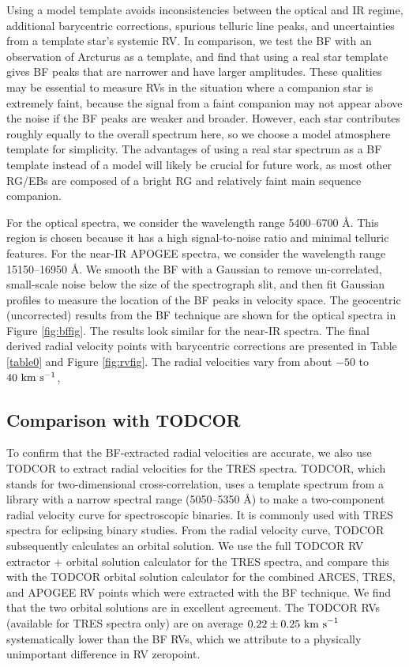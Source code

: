 Using a model template avoids inconsistencies between the optical and IR regime, additional barycentric corrections, spurious telluric line peaks, and uncertainties from a template star's systemic RV. In comparison, we test the BF with an observation of Arcturus as a template, and find that using a real star template gives BF peaks that are narrower and have larger amplitudes. These qualities may be essential to measure RVs in the situation where a companion star is extremely faint, because the signal from a faint companion may not appear above the noise if the BF peaks are weaker and broader. However, each star contributes roughly equally to the overall spectrum here, so we choose a model atmosphere template for simplicity. The advantages of using a real star spectrum as a BF template instead of a model will likely be crucial for future work, as most other RG/EBs are composed of a bright RG and relatively faint main sequence companion.

For the optical spectra, we consider the wavelength range 5400--6700 \AA. This region is chosen because it has a high signal-to-noise ratio and minimal telluric features. For the near-IR APOGEE spectra, we consider the wavelength range 15150--16950 \AA. We smooth the BF with a Gaussian to remove un-correlated, small-scale noise below the size of the spectrograph slit, and then fit Gaussian profiles  to measure the location of the BF peaks in velocity space. The geocentric (uncorrected) results from the BF technique are shown for the optical spectra in Figure \ref{fig:bffig}. The results look similar for the near-IR spectra. The final derived radial velocity points with barycentric corrections are presented in Table \ref{table0} and Figure \ref{fig:rvfig}. The radial velocities vary from about $-50$ to $40 \ \rm{km} \ \rm{s}^{-1}$, 

\subsection{Comparison with TODCOR}\label{todcor}
To confirm that the BF-extracted radial velocities are accurate, we also use TODCOR \citep{zuc94} to extract radial velocities for the TRES spectra. TODCOR, which stands for two-dimensional cross-correlation, uses a template spectrum from a library with a narrow spectral range (5050--5350 \AA) to make a two-component radial velocity curve for spectroscopic binaries. It is commonly used with TRES spectra for eclipsing binary studies. From the radial velocity curve, TODCOR subsequently calculates an orbital solution. We use the full TODCOR RV extractor + orbital solution calculator for the TRES spectra, and compare this with the TODCOR orbital solution calculator for the combined ARCES, TRES, and APOGEE RV points which were extracted with the BF technique. We find that the two orbital solutions are in excellent agreement. The TODCOR RVs (available for TRES spectra only) are on average $0.22 \pm 0.25 \ \rm{km \ s}^{-1}$ systematically lower than the BF RVs, which we attribute to a physically unimportant difference in RV zeropoint.
